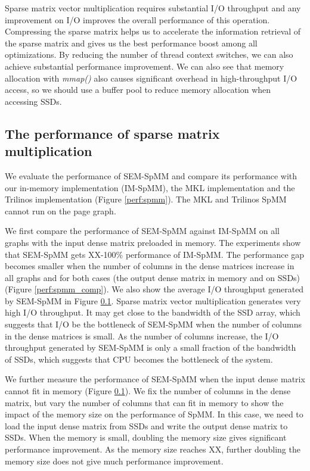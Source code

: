 Sparse matrix vector multiplication requires substantial I/O throughput and
any improvement on I/O improves the overall performance of this operation.
Compressing the sparse matrix helps us to accelerate the information retrieval
of the sparse matrix and gives us the best performance boost among all
optimizations. By reducing the number of thread context switches, we can
also achieve substantial performance improvement. We can also see that
memory allocation with \textit{mmap()} also causes significant overhead
in high-throughput I/O access, so we should use a buffer pool to reduce
memory allocation when accessing SSDs.

\subsection{The performance of sparse matrix multiplication}

We evaluate the performance of SEM-SpMM and compare its performance with
our in-memory implementation (IM-SpMM), the MKL implementation and the Trilinos
implementation (Figure \ref{perf:spmm}). The MKL and Trilinos SpMM cannot run
on the page graph.

We first compare the performance of SEM-SpMM against IM-SpMM on all graphs with
the input dense matrix preloaded in memory. The experiments show that
SEM-SpMM gets XX-100\% performance of IM-SpMM. The performance gap becomes
smaller when the number of columns in the dense matrices increase in all graphs
and for both cases (the output dense matrix in memory and on SSDs) (Figure
\ref{perf:spmm_comp}).
We also show the average I/O throughput generated by SEM-SpMM in
Figure \ref{}. Sparse matrix vector multiplication generates very high I/O
throughput. It may get close to the bandwidth of the SSD array, which suggests
that I/O be the bottleneck of SEM-SpMM when the number of columns in the dense
matrices is small. As the number of columns increase, the I/O throughput
generated by SEM-SpMM is only a small fraction of the bandwidth of SSDs, which
suggests that CPU becomes the bottleneck of the system.

We further measure the performance of SEM-SpMM when the input dense matrix
cannot fit in memory (Figure \ref{}). We fix the number of columns in the dense
matrix, but vary the number of columns that can fit in memory to show
the impact of the memory size on the performance of SpMM. In this case, we need
to load the input dense matrix from SSDs and write the output dense matrix to
SSDs. When the memory
is small, doubling the memory size gives significant performance improvement.
As the memory size reaches XX, further doubling the memory size does not
give much performance improvement.

